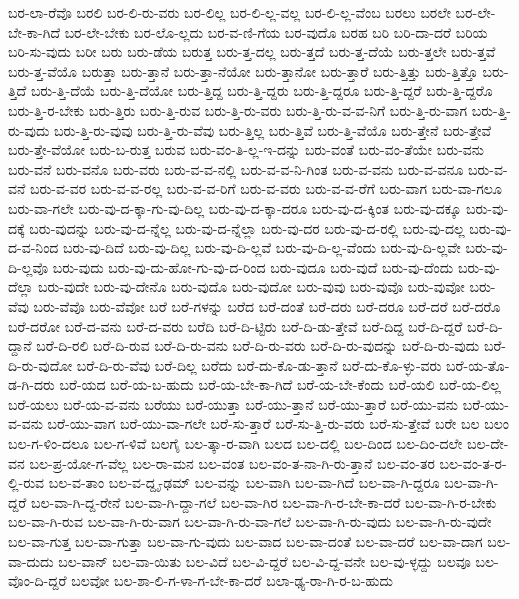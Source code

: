 {ಬರ-ಲಾ-ರೆವೊ
ಬರಲಿ
ಬರ-ಲಿ-ರು-ವರು
ಬರ-ಲಿಲ್ಲ
ಬರ-ಲಿ-ಲ್ಲ-ವಲ್ಲ
ಬರ-ಲಿ-ಲ್ಲ-ವೆಂಬ
ಬರಲು
ಬರಲೇ
ಬರ-ಲೇ-ಬೇ-ಕಾ-ಗಿದೆ
ಬರ-ಲೇ-ಬೇಕು
ಬರ-ಲೊ-ಲ್ಲದು
ಬರ-ವ-ಣಿ-ಗೆಯ
ಬರ-ವುದೊ
ಬರಹ
ಬರಿ
ಬರಿ-ದಾ-ದರೆ
ಬರಿಯ
ಬರಿ-ಸು-ವುದು
ಬರೀ
ಬರು
ಬರು-ಡೆಯ
ಬರುತ್ತ
ಬರು-ತ್ತ-ದಲ್ಲ
ಬರು-ತ್ತದೆ
ಬರು-ತ್ತ-ದೆಯೆ
ಬರು-ತ್ತಲೇ
ಬರು-ತ್ತವೆ
ಬರು-ತ್ತ-ವೆಯೊ
ಬರುತ್ತಾ
ಬರು-ತ್ತಾನೆ
ಬರು-ತ್ತಾ-ನೆಯೋ
ಬರು-ತ್ತಾನೋ
ಬರು-ತ್ತಾರೆ
ಬರು-ತ್ತಿತ್ತು
ಬರು-ತ್ತಿತ್ತೊ
ಬರು-ತ್ತಿದೆ
ಬರು-ತ್ತಿ-ದೆಯೆ
ಬರು-ತ್ತಿ-ದೆಯೋ
ಬರು-ತ್ತಿದ್ದ
ಬರು-ತ್ತಿ-ದ್ದರು
ಬರು-ತ್ತಿ-ದ್ದರೂ
ಬರು-ತ್ತಿ-ದ್ದರೆ
ಬರು-ತ್ತಿ-ದ್ದರೊ
ಬರು-ತ್ತಿ-ರ-ಬೇಕು
ಬರು-ತ್ತಿರು
ಬರು-ತ್ತಿ-ರುವ
ಬರು-ತ್ತಿ-ರು-ವರು
ಬರು-ತ್ತಿ-ರು-ವ-ವ-ನಿಗೆ
ಬರು-ತ್ತಿ-ರು-ವಾಗ
ಬರು-ತ್ತಿ-ರು-ವುದು
ಬರು-ತ್ತಿ-ರು-ವುವು
ಬರು-ತ್ತಿ-ರು-ವೆವು
ಬರು-ತ್ತಿಲ್ಲ
ಬರು-ತ್ತಿವೆ
ಬರು-ತ್ತಿ-ವೆಯೊ
ಬರು-ತ್ತೇನೆ
ಬರು-ತ್ತೇವೆ
ಬರು-ತ್ತೇ-ವೆಯೋ
ಬರು-ಬ-ರುತ್ತ
ಬರುವ
ಬರು-ವಂ-ತಿ-ಲ್ಲ-ಇ-ದನ್ನು
ಬರು-ವಂತೆ
ಬರು-ವಂ-ತೆಯೇ
ಬರು-ವನು
ಬರು-ವನೆ
ಬರು-ವನೊ
ಬರು-ವರು
ಬರು-ವ-ವ-ನಲ್ಲಿ
ಬರು-ವ-ವ-ನಿ-ಗಿಂತ
ಬರು-ವ-ವನು
ಬರು-ವ-ವನೂ
ಬರು-ವ-ವನೆ
ಬರು-ವ-ವರ
ಬರು-ವ-ವ-ರಲ್ಲ
ಬರು-ವ-ವ-ರಿಗೆ
ಬರು-ವ-ವರು
ಬರು-ವ-ವ-ರೆಗೆ
ಬರು-ವಾಗ
ಬರು-ವಾ-ಗಲೂ
ಬರು-ವಾ-ಗಲೇ
ಬರು-ವು-ದ-ಕ್ಕಾ-ಗು-ವು-ದಿಲ್ಲ
ಬರು-ವು-ದ-ಕ್ಕಾ-ದರೂ
ಬರು-ವು-ದ-ಕ್ಕಿಂತ
ಬರು-ವು-ದಕ್ಕೂ
ಬರು-ವು-ದಕ್ಕೆ
ಬರು-ವುದನ್ನು
ಬರು-ವು-ದ-ನ್ನೆಲ್ಲ
ಬರು-ವು-ದ-ನ್ನೆಲ್ಲಾ
ಬರು-ವು-ದರ
ಬರು-ವು-ದ-ರಲ್ಲಿ
ಬರು-ವು-ದಲ್ಲ
ಬರು-ವು-ದ-ವ-ನಿಂದ
ಬರು-ವು-ದಿದೆ
ಬರು-ವು-ದಿಲ್ಲ
ಬರು-ವು-ದಿ-ಲ್ಲವೆ
ಬರು-ವು-ದಿ-ಲ್ಲ-ವೆಂದು
ಬರು-ವು-ದಿ-ಲ್ಲವೇ
ಬರು-ವು-ದಿ-ಲ್ಲವೊ
ಬರು-ವುದು
ಬರು-ವು-ದು-ಹೋ-ಗು-ವು-ದ-ರಿಂದ
ಬರು-ವುದೂ
ಬರು-ವುದೆ
ಬರು-ವು-ದೆಂದು
ಬರು-ವು-ದೆಲ್ಲಾ
ಬರು-ವುದೇ
ಬರು-ವು-ದೇನೊ
ಬರು-ವುದೊ
ಬರು-ವುದೋ
ಬರು-ವುವು
ಬರು-ವುವೊ
ಬರು-ವುವೋ
ಬರು-ವೆವು
ಬರು-ವೆವೊ
ಬರು-ವೆವೋ
ಬರೆ
ಬರೆ-ಗಳನ್ನು
ಬರೆದ
ಬರೆ-ದಂತೆ
ಬರೆ-ದರು
ಬರೆ-ದರೂ
ಬರೆ-ದರೆ
ಬರೆ-ದರೊ
ಬರೆ-ದರೋ
ಬರೆ-ದ-ವನು
ಬರೆ-ದ-ವರು
ಬರೆದಿ
ಬರೆ-ದಿ-ಟ್ಟಿರು
ಬರೆ-ದಿ-ಡು-ತ್ತೇವೆ
ಬರೆ-ದಿದ್ದ
ಬರೆ-ದಿ-ದ್ದರೆ
ಬರೆ-ದಿ-ದ್ದಾನೆ
ಬರೆ-ದಿ-ರಲಿ
ಬರೆ-ದಿ-ರುವ
ಬರೆ-ದಿ-ರು-ವನು
ಬರೆ-ದಿ-ರು-ವರು
ಬರೆ-ದಿ-ರು-ವುದನ್ನು
ಬರೆ-ದಿ-ರು-ವುದು
ಬರೆ-ದಿ-ರು-ವುದೋ
ಬರೆ-ದಿ-ರು-ವೆವು
ಬರೆ-ದಿಲ್ಲ
ಬರೆದು
ಬರೆ-ದು-ಕೊ-ಡು-ತ್ತಾನೆ
ಬರೆ-ದು-ಕೊ-ಳ್ಳು-ವರು
ಬರೆ-ಯ-ತೊ-ಡ-ಗಿ-ದರು
ಬರೆ-ಯದ
ಬರೆ-ಯ-ಬ-ಹುದು
ಬರೆ-ಯ-ಬೇ-ಕಾ-ಗಿದೆ
ಬರೆ-ಯ-ಬೇ-ಕೆಂದು
ಬರೆ-ಯಲಿ
ಬರೆ-ಯ-ಲಿಲ್ಲ
ಬರೆ-ಯಲು
ಬರೆ-ಯ-ವ-ವನು
ಬರೆಯು
ಬರೆ-ಯುತ್ತಾ
ಬರೆ-ಯು-ತ್ತಾನೆ
ಬರೆ-ಯು-ತ್ತಾರೆ
ಬರೆ-ಯು-ವನು
ಬರೆ-ಯು-ವ-ವನು
ಬರೆ-ಯು-ವಾಗ
ಬರೆ-ಯು-ವಾ-ಗಲೇ
ಬರೆ-ಸು-ತ್ತಾರೆ
ಬರೆ-ಸು-ತ್ತಿ-ರು-ವರು
ಬರೆ-ಸು-ತ್ತೇವೆ
ಬರೇ
ಬಲ
ಬಲಂ
ಬಲ-ಗ-ಳಿಂ-ದಲೂ
ಬಲ-ಗ-ಳಿವೆ
ಬಲಗೈ
ಬಲ-ತ್ಕಾ-ರ-ವಾಗಿ
ಬಲದ
ಬಲ-ದಲ್ಲಿ
ಬಲ-ದಿಂದ
ಬಲ-ದಿಂ-ದಲೇ
ಬಲ-ದೇ-ವನ
ಬಲ-ಪ್ರ-ಯೋ-ಗ-ವೆಲ್ಲ
ಬಲ-ರಾ-ಮನ
ಬಲ-ವಂತ
ಬಲ-ವಂ-ತ-ನಾ-ಗಿ-ರು-ತ್ತಾನೆ
ಬಲ-ವಂ-ತರ
ಬಲ-ವಂ-ತ-ರ-ಲ್ಲಿ-ರುವ
ಬಲ-ವ-ತಾಂ
ಬಲ-ವ-ದ್ದೃ-ಢಮ್
ಬಲ-ವನ್ನು
ಬಲ-ವಾಗಿ
ಬಲ-ವಾ-ಗಿದೆ
ಬಲ-ವಾ-ಗಿ-ದ್ದರೂ
ಬಲ-ವಾ-ಗಿ-ದ್ದರೆ
ಬಲ-ವಾ-ಗಿ-ದ್ದ-ರೇನೆ
ಬಲ-ವಾ-ಗಿ-ದ್ದಾ-ಗಲೆ
ಬಲ-ವಾ-ಗಿರ
ಬಲ-ವಾ-ಗಿ-ರ-ಬೇ-ಕಾ-ದರೆ
ಬಲ-ವಾ-ಗಿ-ರ-ಬೇಕು
ಬಲ-ವಾ-ಗಿ-ರುವ
ಬಲ-ವಾ-ಗಿ-ರು-ವಾಗ
ಬಲ-ವಾ-ಗಿ-ರು-ವಾ-ಗಲೆ
ಬಲ-ವಾ-ಗಿ-ರು-ವುದು
ಬಲ-ವಾ-ಗಿ-ರು-ವುದೇ
ಬಲ-ವಾ-ಗುತ್ತ
ಬಲ-ವಾ-ಗುತ್ತಾ
ಬಲ-ವಾ-ಗು-ವುದು
ಬಲ-ವಾದ
ಬಲ-ವಾ-ದಂತೆ
ಬಲ-ವಾ-ದರೆ
ಬಲ-ವಾ-ದಾಗ
ಬಲ-ವಾ-ದುದು
ಬಲ-ವಾನ್
ಬಲ-ವಾ-ಯಿತು
ಬಲ-ವಿದೆ
ಬಲ-ವಿ-ದ್ದರೆ
ಬಲ-ವಿ-ದ್ದ-ವನೇ
ಬಲ-ವು-ಳ್ಳದ್ದು
ಬಲವೂ
ಬಲ-ವೊಂ-ದಿ-ದ್ದರೆ
ಬಲವೋ
ಬಲ-ಶಾ-ಲಿ-ಗ-ಳಾ-ಗ-ಬೇ-ಕಾ-ದರೆ
ಬಲಾ-ಢ್ಯ-ರಾ-ಗಿ-ರ-ಬ-ಹುದು
}
